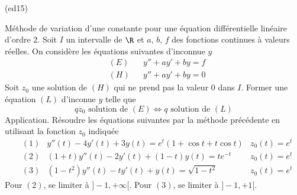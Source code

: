 \begin{tiny}(ed15)\end{tiny} Méthode de variation d'une constante pour une équation différentielle linéaire d'ordre $2$.\newline
Soit $I$ un intervalle de $\R$ et $a$, $b$, $f$ des fonctions continues à valeurs réelles. On considère les équations suivantes d'inconnue $y$
\begin{align*}
 &(E)& &y''+ay'+by = f\\&(H)& &y''+ay'+by = 0
\end{align*}
Soit $z_0$ une solution de $(H)$ qui ne prend pas la valeur $0$ dans $I$. Former une équation $(L)$ d'inconue $y$ telle que 
\begin{displaymath}
 qz_0\text{ solution de } (E) \Leftrightarrow q \text{ solution de } (L)
\end{displaymath}
Application. Résoudre les équations suivantes par la méthode précédente en utilisant la fonction $z_0$ indiquée
\begin{align*}
 &(1)  &y''(t)-4y'(t)+3y(t)=e^{t}(1+\cos t + t\cos t) &z_0(t)=e^t\\
 &(2)  &(1+t)y''(t)-2y'(t)+(1-t)y(t)=te^{-t}&z_0(t)=e^t\\
 &(3) &(1-t^2)y''(t)-ty'(t)+y(t)=\sqrt{1-t^2}&z_0(t)=e^t
\end{align*}
Pour $(2)$, se limiter à $]-1,+\infty[$. Pour $(3)$, se limiter à $]-1,+1[$.